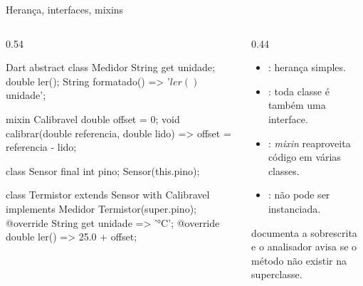 \documentclass[aspectratio=169,10pt]{beamer}
\begin{document}
\begin{frame}[fragile]{Herança, interfaces, mixins}
  \begin{columns}[T]
    \begin{column}{0.54\textwidth}
\begin{codigo}[title=Hierarquia]{Dart}
abstract class Medidor {
  String get unidade;
  double ler();
  String formatado() => '${ler()} $unidade';
}

mixin Calibravel {
  double offset = 0;
  void calibrar(double referencia, double lido) =>
      offset = referencia - lido;
}

class Sensor { final int pino; Sensor(this.pino); }

class Termistor extends Sensor
    with Calibravel implements Medidor {
  Termistor(super.pino);
  @override String get unidade => '°C';
  @override double ler() => 25.0 + offset;
}
\end{codigo}
    \end{column}
    \begin{column}{0.44\textwidth}
      \begin{conceito}[Regras]
        \begin{itemize}
          \item {}: herança simples.
          \item {}: toda classe é também uma interface.
          \item {}: \emph{mixin} reaproveita código em várias classes.
          \item {}: não pode ser instanciada.
        \end{itemize}
      \end{conceito}
      \begin{dica}
         documenta a sobrescrita e o analisador avisa se o método não existir na superclasse.
      \end{dica}
    \end{column}
  \end{columns}
\end{frame}
\end{document}
